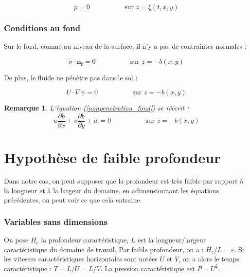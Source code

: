 \documentclass[10pt,a4paper]{amsart}
\newtheorem{remarque}{Remarque}
\begin{document}
\begin{equation}\label{pression_surface}
p=0 \hspace{2cm} \text{ sur } z=\xi(t,x,y)
\end{equation}

\section{Conditions au fond}

Sur le fond, comme au niveau de la surface, il n'y a pas de contraintes normales :

\begin{equation}\label{contrainte_fond}
\overline{\overline{\sigma}} \cdot \mathbf{n_f} = 0 \hspace{2cm} \text{ sur } z=-b(x,y)
\end{equation}

De plus, le fluide ne pénètre pas dans le sol :

\begin{equation}\label{nonpenetration_fond}
U \cdot \nabla \psi = 0 \hspace{2cm} \text{ sur } z=-b(x,y)
\end{equation}

\begin{remarque}
L'équation (\ref{nonpenetration_fond}) se réécrit :
$$u \dfrac{\partial b}{\partial x} + v \dfrac{\partial b}{\partial y} + w = 0 \hspace{2cm} \text{ sur } z=-b(x,y)$$
\end{remarque}


\part{Hypothèse de faible profondeur}

Dans notre cas, on peut supposer que la profondeur est très faible par rapport à la longueur et à la largeur du domaine. en adimensionnant les équations précédentes, on peut voir ce que cela entraine.

\section{Variables sans dimensions}

On pose $H_c$ la profondeur caractéristique, $L$ est la longueur/largeur caractéristique du domaine de travail. Par faible profondeur, on a : $H_c/L = \varepsilon$. Si les vitesses caractéristiques horizontales sont notées $U$ et $V$, on a alors le temps caractéristique : $T=L/U=L/V$. La pression caractéristique est $P=U^2$. 
\end{document}
